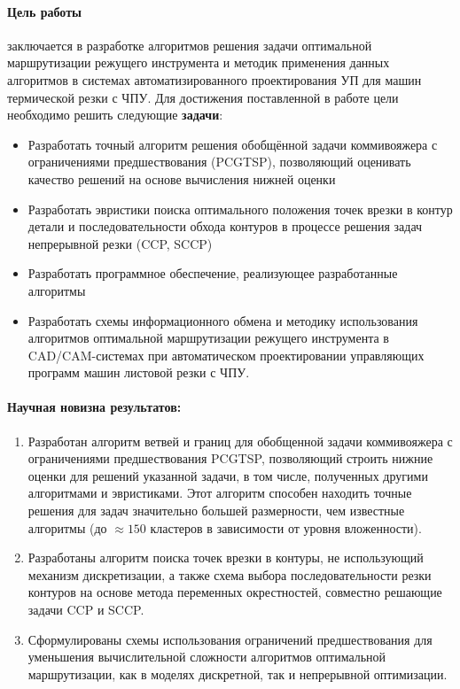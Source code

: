 \paragraph*{Цель работы}
заключается в разработке алгоритмов решения задачи оптимальной
маршрутизации режущего инструмента
и методик применения данных алгоритмов
в системах автоматизированного проектирования УП для машин термической резки с ЧПУ.
Для достижения поставленной в работе цели необходимо решить следующие
\textbf{задачи}:

\begin{itemize}
  \item
    Разработать точный алгоритм решения
    обобщённой задачи коммивояжера
    с ограничениями предшествования (PCGTSP),
    позволяющий оценивать качество решений
    на основе вычисления нижней оценки
  \item
    Разработать эвристики поиска оптимального положения
    точек врезки в контур детали
    и последовательности обхода контуров
    в процессе решения задач
    непрерывной резки
    (CCP, SCCP)
  \item
    Разработать программное обеспечение,
    реализующее разработанные алгоритмы
  \item
    Разработать схемы информационного обмена
    и методику использования алгоритмов
    оптимальной маршрутизации режущего инструмента
    в CAD/CAM-системах
    при автоматическом проектировании
    управляющих программ
    машин листовой резки с ЧПУ.
\end{itemize}

\paragraph*{Научная новизна результатов:}

\begin{enumerate}
    \item
    Разработан алгоритм ветвей и границ для обобщенной задачи коммивояжера с ограничениями предшествования PCGTSP,
    позволяющий строить нижние оценки для решений указанной задачи,
    в том числе, полученных другими алгоритмами и эвристиками.
    Этот алгоритм способен находить точные решения
    для задач значительно большей размерности,
    чем известные алгоритмы
    (до $\approx 150$ кластеров в зависимости от уровня вложенности).
    \item
    Разработаны алгоритм поиска точек врезки в контуры,
    не использующий механизм дискретизации,
    а также схема выбора последовательности резки контуров
    на основе метода переменных окрестностей,
    совместно решающие задачи
    CCP и SCCP.
    \item
    Сформулированы схемы использования ограничений предшествования
    для уменьшения вычислительной сложности алгоритмов оптимальной маршрутизации,
    как в моделях дискретной,
    так и непрерывной оптимизации.
\end{enumerate}

